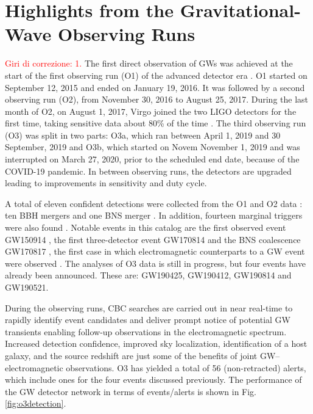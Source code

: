 \documentclass[binding=0.6cm, LaM]{sapthesis}
\newcommand{\fpg}[1]{\textcolor{red}{#1} }
\begin{document}
	
\chapter{Highlights from the Gravitational-Wave Observing Runs}
\label{ch:ObservingRuns}
\fpg{Giri di correzione: 1.}%
	The first direct observation of GWs was achieved at the start of the first observing run (O1) 
	of the advanced detector era \cite{52}.  
	O1 started on September 12, 2015 and ended on January 19, 2016.  
	It was followed by a second observing run (O2), 
	from November 30, 2016 to August 25, 2017.  
	During the last month of O2, on August 1, 2017, Virgo joined the two LIGO detectors for the first time, 	
	taking sensitive data about 80\% of the time \cite{13}.  
	The third observing run (O3) was split in two parts: O3a, which ran between April 1, 2019 and 30 September, 2019 and O3b, 
	which started on  Novem  November 1, 2019 and was interrupted on March 27, 2020, prior to the scheduled end date, 
	because of the COVID-19 pandemic.  
	In between observing runs, the detectors are upgraded leading to improvements in sensitivity and duty cycle.

	A total of eleven confident detections were collected from the O1 and O2 data \cite{13}: 
	ten BBH mergers \cite{14, 52, 58-60} and one BNS merger \cite{61}.  
	In addition, fourteen marginal triggers were also found \cite{13}.
	Notable events in this catalog are the first observed event GW150914 \cite{52},
	the first three-detector event GW170814 \cite{60} and the BNS
	coalescence GW170817 \cite{62}, the first case in which electromagnetic counterparts to a GW event 
	were observed \cite{15}.
        The analyses of O3 data is still in progress, but four events have already been announced.  
	These are: GW190425, GW190412, GW190814 and GW190521.

	During the observing runs, CBC searches are carried out in near real-time 
	to rapidly identify event candidates and deliver prompt notice of potential GW transients 
	enabling follow-up observations in the electromagnetic spectrum. 
	Increased detection confidence, improved sky localization, identification of a host galaxy, 
	and the source redshift are just some of the benefits of joint GW–electromagnetic observations.  
	O3 has yielded a total of 56 (non-retracted) alerts, which include ones for the four events discussed previously.  
	The performance of the GW detector network in terms of events/alerts is shown in Fig.\,\ref{fig:o3detection}. 
\end{document}
